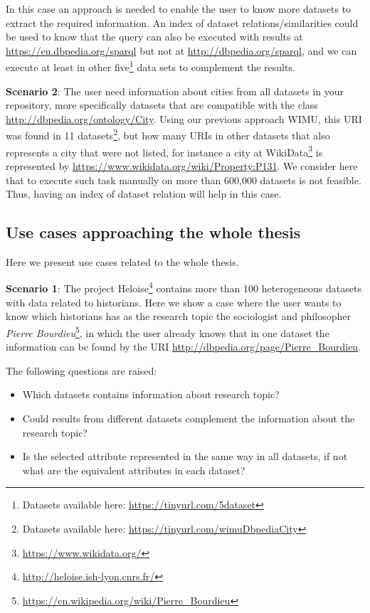  In this case an approach is needed to enable the user to know more datasets to extract the required information. An index of dataset relations/similarities could be used to know that the query can also be executed with results at \url{https://eu.dbpedia.org/sparql} but not at \url{http://dbpedia.org/sparql}, and we can execute at least in other five\footnote{Datasets available here: \url{https://tinyurl.com/5dataset}} data sets to complement the results.

 \textbf{Scenario 2}: The user need information about cities from all datasets in your repository, more specifically datasets that are compatible with the class \url{http://dbpedia.org/ontology/City}. Using our previous approach WIMU\cite{valdestilhas2018my}, this URI was found in 11 datasets\footnote{Datasets available here: \url{https://tinyurl.com/wimuDbpediaCity}}, but how many URIs in other datasets that also represents a city that were not listed, for instance a city at WikiData\footnote{\url{https://www.wikidata.org/}} is represented by  \url{https://www.wikidata.org/wiki/Property:P131}.
 We consider here that to execute such task manually on more than 600,000 datasets is not feasible. Thus, having an index of dataset relation will help in this case.

\subsection{Use cases approaching the whole thesis}
Here we present use cases related to the whole thesis.

\textbf{Scenario 1}: The project Heloise\footnote{\url{http://heloise.ish-lyon.cnrs.fr/}} contains more than 100 heterogeneous datasets with data related to historians. Here we show a case where the user wants to know which historians has as the research topic the sociologist and philosopher \textit{Pierre Bourdieu}\footnote{\url{https://en.wikipedia.org/wiki/Pierre_Bourdieu}}, in which the user already knows that in one dataset the information can be found by the URI \url{http://dbpedia.org/page/Pierre_Bourdieu}. 

The following questions are raised:
\begin{itemize}
    \item Which datasets contains information about research topic?
    \item Could results from different datasets complement the information about the research topic?
    \item Is the selected attribute represented in the same way in all datasets, if not what are the equivalent attributes in each dataset?
\end{itemize}

